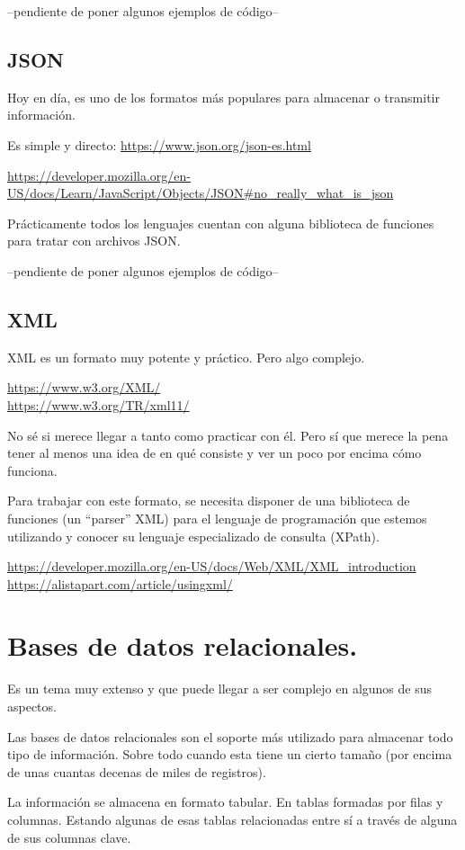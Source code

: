 \documentclass[spanish,12pt,a4paper,final,oneside]{book}
\begin{document}
--pendiente de poner algunos ejemplos de código--


\subsection{JSON}
Hoy en día, es uno de los formatos más populares para almacenar o transmitir información.

Es simple y directo:  \url{https://www.json.org/json-es.html}

\url{https://developer.mozilla.org/en-US/docs/Learn/JavaScript/Objects/JSON#no_really_what_is_json}

Prácticamente todos los lenguajes cuentan con alguna biblioteca de funciones para tratar con archivos JSON.

--pendiente de poner algunos ejemplos de código--


\subsection{XML}
XML es un formato muy potente y práctico. Pero algo complejo.

\url{https://www.w3.org/XML/}
\\ \url{https://www.w3.org/TR/xml11/}

No sé si merece llegar a tanto como practicar con él. Pero sí que merece la pena tener al menos una idea de en qué consiste y ver un poco por encima cómo funciona.

Para trabajar con este formato, se necesita disponer de una biblioteca de funciones (un ``parser'' XML) para el lenguaje de programación que estemos utilizando y conocer su lenguaje especializado de consulta (XPath).

\url{https://developer.mozilla.org/en-US/docs/Web/XML/XML_introduction}
\\ \url{https://alistapart.com/article/usingxml/}


\section{Bases de datos relacionales.}
Es un tema muy extenso y que puede llegar a ser complejo en algunos de sus aspectos.

Las bases de datos relacionales son el soporte más utilizado para almacenar todo tipo de información. Sobre todo cuando esta tiene un cierto tamaño (por encima de unas cuantas decenas de miles de registros).

La información se almacena en formato tabular. En tablas formadas por filas y columnas. Estando algunas de esas tablas relacionadas entre sí a través de alguna de sus columnas clave.
\end{document}
